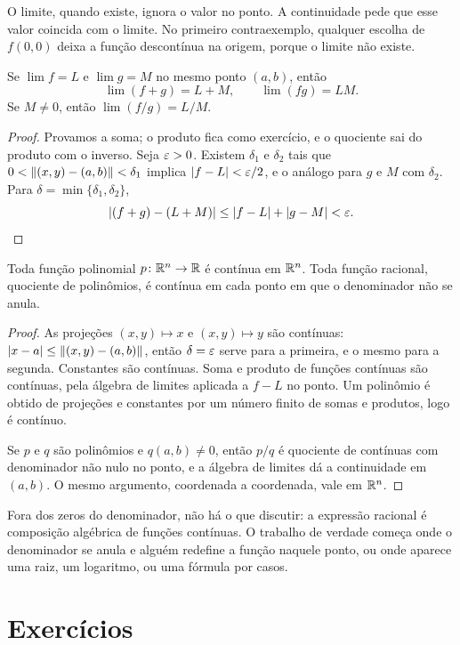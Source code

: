 \documentclass[11pt,a4paper]{article}
\begin{document}
O limite, quando existe, ignora o valor no ponto. A continuidade pede que esse valor coincida com o limite. No primeiro contraexemplo, qualquer escolha de $f(0,0)$ deixa a função descontínua na origem, porque o limite não existe.

\begin{teorema}
Se $\lim f=L$ e $\lim g=M$ no mesmo ponto $(a,b)$, então
\[
\lim(f+g)=L+M,\qquad \lim(fg)=LM.
\]
Se $M\neq 0$, então $\lim(f/g)=L/M$.
\end{teorema}

\begin{proof}
Provamos a soma; o produto fica como exercício, e o quociente sai do produto com o inverso. Seja $\varepsilon>0$. Existem $\delta_1$ e $\delta_2$ tais que $0<\left\lVert (x,y)-(a,b) \right\rVert<\delta_1$ implica $\left\lvert f-L \right\rvert<\varepsilon/2$, e o análogo para $g$ e $M$ com $\delta_2$. Para $\delta=\min\{\delta_1,\delta_2\}$,
\[
\left\lvert (f+g)-(L+M) \right\rvert\le\left\lvert f-L \right\rvert+\left\lvert g-M \right\rvert<\varepsilon.
\]
\end{proof}

\begin{corolario}
Toda função polinomial $p\colon\mathbb{R}^n\to\mathbb{R}$ é contínua em $\mathbb{R}^n$. Toda função racional, quociente de polinômios, é contínua em cada ponto em que o denominador não se anula.
\end{corolario}

\begin{proof}
As projeções $(x,y)\mapsto x$ e $(x,y)\mapsto y$ são contínuas: $\left\lvert x-a \right\rvert\le\left\lVert (x,y)-(a,b) \right\rVert$, então $\delta=\varepsilon$ serve para a primeira, e o mesmo para a segunda. Constantes são contínuas. Soma e produto de funções contínuas são contínuas, pela álgebra de limites aplicada a $f-L$ no ponto. Um polinômio é obtido de projeções e constantes por um número finito de somas e produtos, logo é contínuo.

Se $p$ e $q$ são polinômios e $q(a,b)\neq 0$, então $p/q$ é quociente de contínuas com denominador não nulo no ponto, e a álgebra de limites dá a continuidade em $(a,b)$. O mesmo argumento, coordenada a coordenada, vale em $\mathbb{R}^n$.
\end{proof}

Fora dos zeros do denominador, não há o que discutir: a expressão racional é composição algébrica de funções contínuas. O trabalho de verdade começa onde o denominador se anula e alguém redefine a função naquele ponto, ou onde aparece uma raiz, um logaritmo, ou uma fórmula por casos.

\section{Exercícios}
\end{document}
